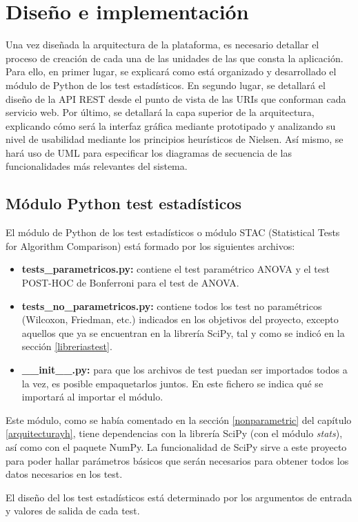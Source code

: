 \chapter{Diseño e implementación}
Una vez diseñada la arquitectura de la plataforma, es necesario detallar el proceso de creación de cada una de las unidades de las que consta la aplicación. Para ello, en primer lugar, se explicará como está organizado y desarrollado el módulo de Python de los test estadísticos. En segundo lugar, se detallará el diseño de la API REST desde el punto de vista de las URIs que conforman cada servicio web. Por último, se detallará la capa superior de la arquitectura, explicando cómo será la interfaz gráfica mediante prototipado y analizando su nivel de usabilidad mediante los principios heurísticos de Nielsen. Así mismo, se hará uso de UML para especificar los diagramas de secuencia de las funcionalidades más relevantes del sistema.

\section{Módulo Python test estadísticos} \label{dis_py}
El módulo de Python de los test estadísticos o módulo STAC (Statistical Tests for Algorithm Comparison) está formado por los siguientes archivos:
\begin{itemize}
\item \textbf{tests\_parametricos.py:} contiene el test paramétrico ANOVA y el test POST-HOC de Bonferroni para el test de ANOVA.
\item \textbf{tests\_no\_parametricos.py:} contiene todos los test no paramétricos (Wilcoxon, Friedman, etc.) indicados en los objetivos del proyecto, excepto aquellos que ya se encuentran en la librería SciPy, tal y como se indicó en la sección \ref{libreriastest}.
\item \textbf{\_\_init\_\_.py:} para que los archivos de test puedan ser importados todos a la vez, es posible empaquetarlos juntos. En este fichero se indica qué se importará al importar el módulo.
\end{itemize}
Este módulo, como se había comentado en la sección \ref{nonparametric} del capítulo \ref{arquitecturayh}, tiene dependencias con la librería SciPy (con el módulo \textit{stats}), así como con el paquete NumPy. La funcionalidad de SciPy sirve a este proyecto para poder hallar parámetros básicos que serán necesarios para obtener todos los datos necesarios en los test.

El diseño del los test estadísticos está determinado por los argumentos de entrada y valores de salida de cada test.

